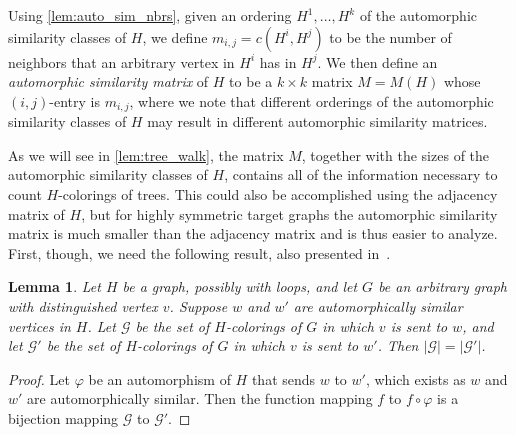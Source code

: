 \documentclass[11pt]{article}
\newtheorem{lemma}[theorem]{Lemma}
\theoremstyle{definition}
\begin{document}
Using \cref{lem:auto_sim_nbrs}, given an ordering $H^1,\ldots, H^k$ of the automorphic similarity classes of $H$, we define $m_{i,j} = c(H^i, H^j)$ to be the number of neighbors that an arbitrary vertex in $H^i$ has in $H^j$. We then define an \emph{automorphic similarity matrix} of $H$ to be a $k \times k$ matrix $M = M(H)$ whose $(i,j)$-entry is $m_{i,j}$, where we note that different orderings of the automorphic similarity classes of $H$ may result in different automorphic similarity matrices.

As we will see in \cref{lem:tree_walk}, the matrix $M$, together with the sizes of the automorphic similarity classes of $H$, contains all of the information necessary to count $H$-colorings of trees. This could also be accomplished using the adjacency matrix of $H$, but for highly symmetric target graphs the automorphic similarity matrix is much smaller than the adjacency matrix and is thus easier to analyze. First, though, we need the following result, also presented in~\cite{GalvinMcMillonNirRedlich2025}. %

\begin{lemma} \label{lem:using_iso}
Let $H$ be a graph, possibly with loops, and let $G$ be an arbitrary graph with distinguished vertex $v$. Suppose $w$ and $w'$ are automorphically similar vertices in $H$. Let ${\mathcal G}$ be the set of $H$-colorings of $G$ in which $v$ is sent to $w$, and let ${\mathcal G}'$ be the set of $H$-colorings of $G$ in which $v$ is sent to $w'$. Then $|{\mathcal G}|=|{\mathcal G}'|$.
\end{lemma}

\begin{proof}
Let $\varphi$ be an automorphism of $H$ that sends $w$ to $w'$, which exists as $w$ and $w'$ are automorphically similar. Then the function mapping $f$ to $f \circ \varphi$ is a bijection mapping ${\mathcal G}$ to ${\mathcal G}'$. 
\end{proof}
\end{document}
